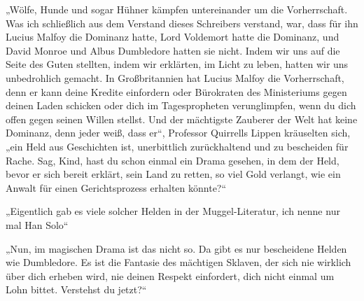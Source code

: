 „Wölfe, Hunde und sogar Hühner kämpfen untereinander um die Vorherrschaft. Was ich schließlich aus dem Verstand dieses Schreibers verstand, war, dass für ihn Lucius Malfoy die Dominanz hatte, Lord Voldemort hatte die Dominanz, und David Monroe und Albus Dumbledore hatten sie nicht. Indem wir uns auf die Seite des Guten stellten, indem wir erklärten, im Licht zu leben, hatten wir uns unbedrohlich gemacht. In Großbritannien hat Lucius Malfoy die Vorherrschaft, denn er kann deine Kredite einfordern oder Bürokraten des Ministeriums gegen deinen Laden schicken oder dich im Tagespropheten verunglimpfen, wenn du dich offen gegen seinen Willen stellst. Und der mächtigste Zauberer der Welt hat keine Dominanz, denn jeder weiß, dass er“, Professor Quirrells Lippen kräuselten sich, „ein Held aus Geschichten ist, unerbittlich zurückhaltend und zu bescheiden für Rache. Sag, Kind, hast du schon einmal ein Drama gesehen, in dem der Held, bevor er sich bereit erklärt, sein Land zu retten, so viel Gold verlangt, wie ein Anwalt für einen Gerichtsprozess erhalten könnte?“

„Eigentlich gab es viele solcher Helden in der Muggel-Literatur, ich nenne nur mal Han Solo“

„Nun, im magischen Drama ist das nicht so. Da gibt es nur bescheidene Helden wie Dumbledore. Es ist die Fantasie des mächtigen Sklaven, der sich nie wirklich über dich erheben wird, nie deinen Respekt einfordert, dich nicht einmal um Lohn bittet. Verstehst du jetzt?“

